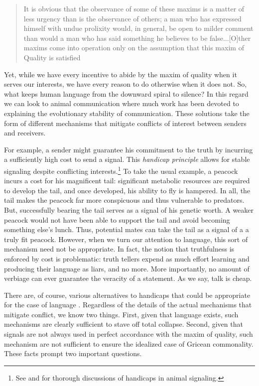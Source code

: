 \documentclass[linguex]{sp}
\theoremstyle{definition} \newtheorem{definition}{Definition}
\begin{document}
\begin{quote}
It is obvious that the observance of some of these maxims is a matter of less urgency than is the observance of others; a man who has expressed himself with undue prolixity would, in general, be open to milder comment than would a man who has said something he believes to be false...[O]ther maxims come into operation only on the assumption that this maxim of Quality is satisfied \citep[27]{grice1975}
\end{quote}
Yet, while we have every incentive to abide by the maxim of quality when it serves our interests, we have every reason to do otherwise when it does not. So, what keeps human language from the downward spiral to silence? In this regard we can look to animal communication where much work has been devoted to explaining the evolutionary stability of communication. These solutions take the form of different mechanisms that mitigate conflicts of interest between senders and receivers. 

For example, a sender might guarantee his commitment to the truth by incurring a sufficiently high cost to send a signal. This \emph{handicap principle}  \citep{Zahavi:1975} allows for stable signaling despite conflicting interests.\footnote{See \cite{maynard-smith-harper:2004} and \cite{searcy-nowicki:2005} for thorough discussions of handicaps in animal signaling.} To take the usual example, a peacock incurs a cost for his magnificent tail: significant metabolic resources are required to develop the tail, and once developed, his ability to fly is hampered. In all, the tail makes the peacock far more conspicuous and thus vulnerable to predators. But, successfully bearing the tail serves as a signal of his genetic worth. A weaker peacock would not have been able to support the tail and avoid becoming something else's lunch. Thus, potential mates  can take the tail as a signal of a a truly fit peacock. However, when we turn our attention to language, this sort of mechanism need not be appropriate.  In fact, the notion that truthfulness is enforced by cost is problematic: truth tellers expend as much effort learning and producing their language as liars, and no more. More importantly, no amount of verbiage can ever guarantee the veracity of a statement. As we say, talk is cheap. 

There are, of course, various alternatives to handicaps that could be appropriate for the case of language \citep{scott-phillips:2008}. Regardless of the details of the actual mechanisms that mitigate conflict, we know two things. First, given that language exists, such mechanisms are clearly sufficient to stave off total collapse. Second, given that signals are not always used in perfect accordance with the maxim of quality, such mechanism are not sufficient to ensure the idealized case of Gricean commonality. These facts prompt two important questions.
\end{document}
